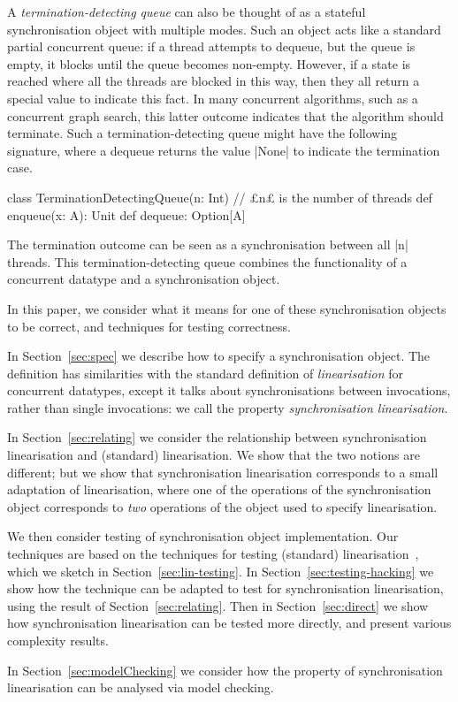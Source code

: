 A \emph{termination-detecting queue} can also be thought of as a stateful
synchronisation object with multiple modes.  Such an object acts like a
standard partial concurrent queue: if a thread attempts to dequeue, but the
queue is empty, it blocks until the queue becomes non-empty.  However, if a
state is reached where all the threads are blocked in this way, then they all
return a special value to indicate this fact.  In many concurrent algorithms,
such as a concurrent graph search, this latter outcome indicates that the
algorithm should terminate.  Such a termination-detecting queue might have the
following signature, where a dequeue returns the value |None| to indicate the
termination case.
%
\begin{scala}
class TerminationDetectingQueue(n: Int){ // £n£ is the number of threads   
  def enqueue(x: A): Unit
  def dequeue: Option[A]
}
\end{scala} 
%
The termination outcome can be seen as a synchronisation between all |n|
threads.  This termination-detecting queue combines the functionality of a
concurrent datatype and a synchronisation object.



In this paper, we consider what it means for one of these synchronisation
objects to be correct, and techniques for testing correctness.  

In Section~\ref{sec:spec} we describe how to specify a synchronisation
object.  The definition has similarities with the standard definition of
\emph{linearisation} for concurrent datatypes, except it talks about
synchronisations between invocations, rather than single invocations: we call
the property \emph{synchronisation linearisation}. 

In Section~\ref{sec:relating} we consider the relationship between
synchronisation linearisation and (standard) linearisation.  We show that the
two notions are different; but we show that synchronisation linearisation
corresponds to a small adaptation of linearisation, where one of the
operations of the synchronisation object corresponds to \emph{two} operations
of the object used to specify linearisation.  

We then consider testing of synchronisation object implementation.  Our
techniques are based on the techniques for testing (standard)
linearisation~\cite{gavin:lin-testing}, which we sketch in
Section~\ref{sec:lin-testing}.  In Section~\ref{sec:testing-hacking} we show
how the technique can be adapted to test for synchronisation linearisation,
using the result of Section~\ref{sec:relating}.  Then in
Section~\ref{sec:direct} we show how synchronisation linearisation can be
tested more directly, and present various complexity results.

In Section~\ref{sec:modelChecking} we consider how the property of
synchronisation linearisation can be analysed via model checking.  

